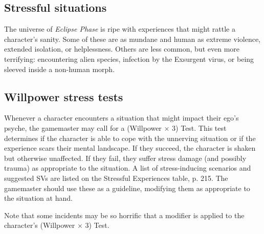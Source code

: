 \subsection{Stressful situations} \label{sec:stressful-situations} 

The universe of \emph{Eclipse Phase} is ripe with experiences that might rattle a character’s sanity. Some of these are as mundane and human as extreme violence, extended isolation, or helplessness. Others are less common, but even more terrifying: encountering alien species, infection by the Exsurgent virus, or being sleeved inside a non-human morph. 



\subsection{Willpower stress tests} \label{sec:willpower-stress-tests} 

Whenever a character encounters a situation that might impact their ego’s psyche, the gamemaster may call for a (Willpower $\times$ 3) Test. This test determines if the character is able to cope with the unnerving situation or if the experience scars their mental landscape. If they succeed, the character is shaken but otherwise unaffected. If they fail, they suffer stress damage (and possibly trauma) as appropriate to the situation. A list of stress-inducing scenarios and suggested SVs are listed on the Stressful Experiences table, p. 215. The gamemaster should use these as a guideline, modifying them as appropriate to the situation at hand. 

Note that some incidents may be so horrific that a modifier is applied to the character’s (Willpower $\times$ 3) Test. 

